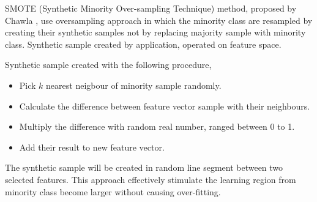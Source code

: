 SMOTE (Synthetic Minority Over-sampling Technique) method, proposed by Chawla
\cite{chawla2002smote},
use oversampling approach in which the minority class are resampled by creating
their synthetic samples not by replacing majority sample with minority class.
Synthetic sample created by application, operated on feature space.

Synthetic sample created with the following procedure,
\begin{itemize}
\item Pick $k$ nearest neigbour of minority sample randomly.
\item Calculate the difference between feature vector sample with their
neighbours.
\item Multiply the difference with random real number, ranged between 0 to 1.
\item Add their result to new feature vector.
\end{itemize}

The synthetic sample will be created in random line segment between two
selected features.
This approach effectively stimulate the learning region from minority class
become larger without causing over-fitting.
